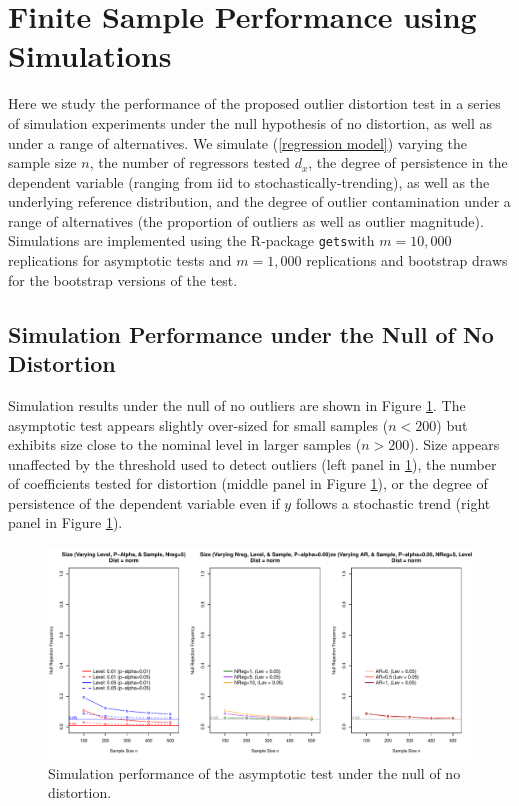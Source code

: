 \documentclass[11pt, letterpaper]{article}
\numberwithin{algorithm}{section}
\numberwithin{assumption}{section}
\numberwithin{lemma}{section}
\numberwithin{theorem}{section}
\numberwithin{corollary}{section}
\numberwithin{remark}{section}
\numberwithin{equation}{section}
\numberwithin{figure}{section}
\numberwithin{table}{section}
\providecommand{\DIFadd}[1]{{\protect\color{blue}\uwave{#1}}} %
\providecommand{\DIFaddbegin}{} %
\providecommand{\DIFaddend}{} %
\newcommand{\DIFaddincludegraphics}[2][]{{\color{blue}\fbox{\DIFOincludegraphics[#1]{#2}}}} %
\DeclareRobustCommand{\DIFaddbegin}{\DIFOaddbegin \let\includegraphics\DIFaddincludegraphics} %
\DeclareRobustCommand{\DIFaddend}{\DIFOaddend \let\includegraphics\DIFOincludegraphics} %
\begin{document}
\section{Finite Sample Performance using Simulations} \label{sec_simulations}
Here we study the performance of the proposed outlier distortion test in a series of simulation experiments under the null hypothesis of no distortion, as well as under a range of alternatives. We simulate (\ref{regression model}) varying the sample size $n$, the number of regressors tested $d_x$, the degree of persistence in the dependent variable (ranging from iid to stochastically-trending), as well as the underlying reference distribution, and the degree of outlier contamination under a range of alternatives (the proportion of outliers as well as outlier magnitude). Simulations are implemented using the R-package  \texttt{gets}\DIFaddbegin \DIFadd{, }\DIFaddend with $m=10,000$ replications for asymptotic tests and $m=1,000$ replications and bootstrap draws for the bootstrap versions of the test.

\subsection{Simulation Performance under the Null of No Distortion}


Simulation results under the null of no outliers are shown in Figure \ref{fig_out_sim_null}. The asymptotic test appears slightly over-sized for small samples ($n<200$) but exhibits size close to the nominal level in larger samples ($n>200$). Size appears unaffected by the threshold used to detect outliers (left panel in \ref{fig_out_sim_null}), the number of coefficients tested for distortion (middle panel in Figure \ref{fig_out_sim_null}), or the degree of persistence of the dependent variable even if $y$ follows a stochastic trend (right panel in Figure \ref{fig_out_sim_null}).

\begin{figure}[!htbp]  %
\centering
\includegraphics[scale=0.6]{null_distnorm.pdf}
\caption{Simulation performance of the asymptotic test under the null of no distortion.}
\label{fig_out_sim_null}
\end{figure}
\end{document}
